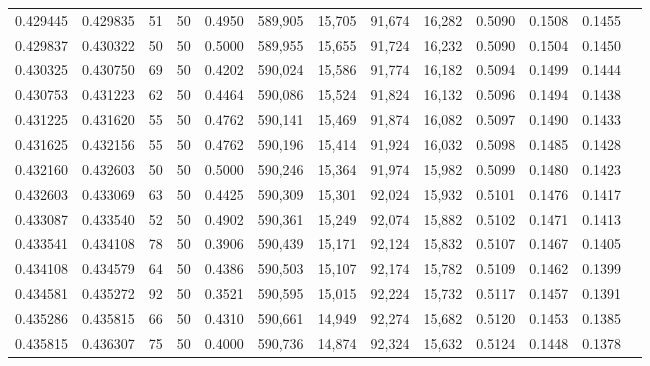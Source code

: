 \begin{tabular}{rrrrrrrrrrrrr}
0.429445 & 0.429835 &    51 &  50 &                                     0.4950 & 589,905 &  15,705 &  91,674 &  16,282 & 0.5090 & 0.1508 & 0.1455 \\
0.429837 & 0.430322 &    50 &  50 &                                     0.5000 & 589,955 &  15,655 &  91,724 &  16,232 & 0.5090 & 0.1504 & 0.1450 \\
0.430325 & 0.430750 &    69 &  50 &                                     0.4202 & 590,024 &  15,586 &  91,774 &  16,182 & 0.5094 & 0.1499 & 0.1444 \\
0.430753 & 0.431223 &    62 &  50 &                                     0.4464 & 590,086 &  15,524 &  91,824 &  16,132 & 0.5096 & 0.1494 & 0.1438 \\
0.431225 & 0.431620 &    55 &  50 &                                     0.4762 & 590,141 &  15,469 &  91,874 &  16,082 & 0.5097 & 0.1490 & 0.1433 \\
0.431625 & 0.432156 &    55 &  50 &                                     0.4762 & 590,196 &  15,414 &  91,924 &  16,032 & 0.5098 & 0.1485 & 0.1428 \\
0.432160 & 0.432603 &    50 &  50 &                                     0.5000 & 590,246 &  15,364 &  91,974 &  15,982 & 0.5099 & 0.1480 & 0.1423 \\
0.432603 & 0.433069 &    63 &  50 &                                     0.4425 & 590,309 &  15,301 &  92,024 &  15,932 & 0.5101 & 0.1476 & 0.1417 \\
0.433087 & 0.433540 &    52 &  50 &                                     0.4902 & 590,361 &  15,249 &  92,074 &  15,882 & 0.5102 & 0.1471 & 0.1413 \\
0.433541 & 0.434108 &    78 &  50 &                                     0.3906 & 590,439 &  15,171 &  92,124 &  15,832 & 0.5107 & 0.1467 & 0.1405 \\
0.434108 & 0.434579 &    64 &  50 &                                     0.4386 & 590,503 &  15,107 &  92,174 &  15,782 & 0.5109 & 0.1462 & 0.1399 \\
0.434581 & 0.435272 &    92 &  50 &                                     0.3521 & 590,595 &  15,015 &  92,224 &  15,732 & 0.5117 & 0.1457 & 0.1391 \\
0.435286 & 0.435815 &    66 &  50 &                                     0.4310 & 590,661 &  14,949 &  92,274 &  15,682 & 0.5120 & 0.1453 & 0.1385 \\
0.435815 & 0.436307 &    75 &  50 &                                     0.4000 & 590,736 &  14,874 &  92,324 &  15,632 & 0.5124 & 0.1448 & 0.1378 \\

\end{tabular}
